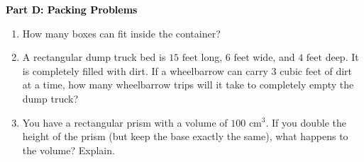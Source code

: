 \documentclass[12pt, letterpaper, fleqn]{article}
\newcommand{\blanklong}{\underline{\hspace{6.5cm}}}
\begin{document}
\begin{tcolorbox}[colback=customteal!20]
\large\textcolor{black}{\textbf{Part D: Packing Problems}}
\end{tcolorbox}

\vspace{3mm}

\begin{enumerate}[itemsep=5.5cm, leftmargin=0.6cm, resume]
\item How many boxes can fit inside the container? \blanklong
\item A rectangular dump truck bed is $15\text{ feet}$ long, $6\text{ feet}$ wide, and $4\text{ feet}$ deep. It is completely filled with dirt. If a wheelbarrow can carry $3\text{ cubic feet}$ of dirt at a time, how many wheelbarrow trips will it take to completely empty the dump truck?
\item You have a rectangular prism with a volume of $100\text{ cm}^3$. If you double the height of the prism (but keep the base exactly the same), what happens to the volume? Explain.
\end{enumerate}
\end{document}
